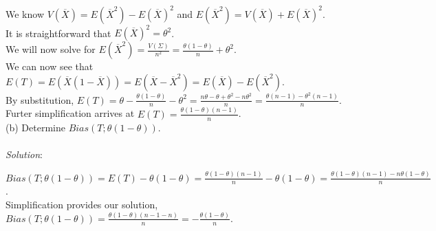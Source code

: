 \documentclass[12pt]{article}
\newcommand{\XB}{\color{black}}
\newcommand{\XV}{\color{violet}}
\begin{document}
\noindent
We know $ V(\overline{X}) = E(\overline{X}^{2}) - E(\overline{X})^{2} $ and $ E(\overline{X}^{2}) = V(\overline{X}) + E(\overline{X})^{2} $. \\

\noindent
It is straightforward that $ E(\overline{X})^{2} = \theta^{2} $. \\

\noindent
We will now solve for $ \displaystyle E(\overline{X}^{2}) = \frac{V(\Sigma)}{n^2} = \frac{\theta(1 - \theta)}{n} + \theta^{2} $. \\

\noindent
We can now see that $ E(T) = E(\overline{X}(1 - \overline{X})) = E(\overline{X} - \overline{X}^{2}) = E(\overline{X}) - E(\overline{X}^2) $. \\

\noindent
By substitution, $ \displaystyle E(T) = \theta - \frac{\theta(1 - \theta)}{n} - \theta^{2} = \frac{n\theta - \theta + \theta^{2} - n\theta^{2}}{n} = \frac{\theta(n - 1) - \theta^{2}(n - 1)}{n} $. \\

\noindent
Furter simplification arrives at $ \displaystyle E(T) = \frac{\theta(1 - \theta)(n - 1)}{n} $. \\



(b) Determine $ Bias(T; \theta(1 - \theta)) $. \\
\vspace{2.5mm} \\
\textit{Solution}:
\vspace{2.5mm}

\noindent 
$ \displaystyle Bias(T; \theta(1 - \theta)) = E(T) - \theta(1 - \theta) = \frac{\theta(1 - \theta)(n - 1)}{n} - \theta(1 - \theta) = \frac{\theta(1 - \theta)(n - 1) - n\theta(1 - \theta)}{n} $. \\

\noindent
Simplification provides our solution, $ \displaystyle Bias(T; \theta(1 - \theta)) = \frac{\theta(1 - \theta)(n - 1 - n)}{n} = -\frac{\theta(1 - \theta)}{n} $. \\
\end{document}
